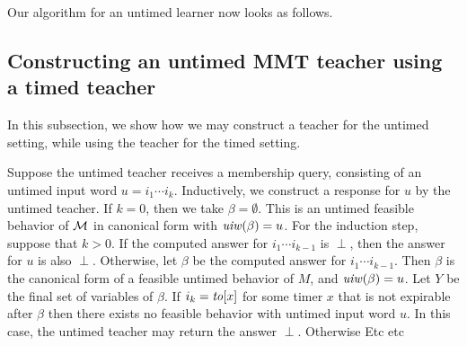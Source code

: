 Our algorithm for an untimed learner now looks as follows.

%

\subsection{Constructing an untimed MMT teacher using a timed teacher}
In this subsection, we show how we may construct a teacher for the untimed setting, while using the
teacher for the timed setting.

Suppose the untimed teacher receives a membership query, consisting of an untimed input word
$u = i_1 \cdots i_k$.
Inductively, we construct a response for $u$ by the untimed teacher.
If $k=0$, then we take $\beta = \emptyset$.
This is an untimed feasible behavior of ${\cal M}$ in canonical form with $\mathit{uiw}(\beta)=u$.
For the induction step, suppose that $k>0$.
If the computed answer for $i_1 \cdots i_{k-1}$ is $\perp$, then the answer for $u$ is also $\perp$.
Otherwise, let $\beta$ be the computed answer for $i_1 \cdots i_{k-1}$.
Then $\beta$ is the canonical form of a feasible untimed behavior of $M$, and $\mathit{uiw}(\beta)=u$.
Let $Y$ be the final set of variables of $\beta$.
If $i_k = \mathit{to}[x]$ for some timer $x$ that is not expirable after $\beta$ then there exists no feasible behavior
with untimed input word $u$. In this case, the untimed teacher may return the answer $\perp$.
Otherwise  Etc etc

